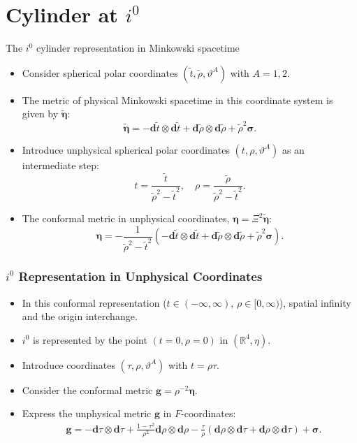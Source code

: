 \documentclass{beamer}
\theoremstyle{remark}
\theoremstyle{plain}
\theoremstyle{plain}
\begin{document}
\section{Cylinder at $i^0$}
\begin{frame}{The $i^0$ cylinder representation in Minkowski  spacetime}
  \begin{itemize}
    \item Consider spherical polar coordinates $(\tilde{t}, \tilde{\rho}, \vartheta^A)$
    with $A = 1, 2$.
    \item The metric of physical Minkowski spacetime in this coordinate system is given by $\tilde{\boldsymbol{\eta}}$:
    \begin{equation}
      \tilde{\boldsymbol{\eta}}=-\mathbf{d} \tilde{t} \otimes \mathbf{d} \tilde{t}+\mathbf{d} \tilde{\rho} \otimes \mathbf{d} \tilde{\rho}+\tilde{\rho}^2 \boldsymbol{\sigma}.
    \end{equation}
    \item Introduce unphysical spherical polar coordinates $(t, \rho, \vartheta^A)$ as an intermediate step:
    \begin{equation}
      t = \frac{\tilde{t}}{\tilde{\rho}^2 - \tilde{t}^2}, \quad \rho = \frac{\tilde{\rho}}{\tilde{\rho}^2 - \tilde{t}^2}.
    \end{equation}
    \item The conformal metric in unphysical coordinates, $\boldsymbol{\eta} = \Xi^2 \boldsymbol{\tilde{\eta}}$: 
    \begin{equation}
      \boldsymbol{\eta} = -\frac{1}{\tilde{\rho}^2 - \tilde{t}^2} (-\mathbf{d} \tilde{t} \otimes \mathbf{d} \tilde{t} + \mathbf{d} \tilde{\rho} \otimes \mathbf{d} \tilde{\rho} + \tilde{\rho}^2 \boldsymbol{\sigma}).
    \end{equation}
  \end{itemize}
\end{frame}

\begin{frame}
  \frametitle{$i^0$ Representation in Unphysical Coordinates}
  \begin{itemize}
    \item In this conformal representation ($t \in (-\infty, \infty)$, $\rho \in [0, \infty)$), spatial infinity and the origin interchange.
    \item $i^0$ is represented by the point $(t = 0, \rho = 0)$ in $(\mathbb{R}^4, \eta)$.
    \item Introduce coordinates $(\tau, \rho, \vartheta^A)$ with $t = \rho \tau$.
    \item Consider the conformal metric $\boldsymbol{g} = \rho^{-2} \boldsymbol{\eta}$.
    \item Express the unphysical metric $\boldsymbol{g}$ in $F$-coordinates:
    \begin{align}
      & \boldsymbol{g} = -\mathbf{d} \tau \otimes \mathbf{d} \tau + \frac{1 - \tau^2}{\rho^2} \mathbf{d} \rho \otimes \mathbf{d} \rho - \frac{\tau}{\rho} \left(\mathbf{d} \rho \otimes \mathbf{d} \tau + \mathbf{d} \rho \otimes \mathbf{d} \tau\right) + \boldsymbol{\sigma}.
    \end{align}
  \end{itemize}
\end{frame}
\end{document}
